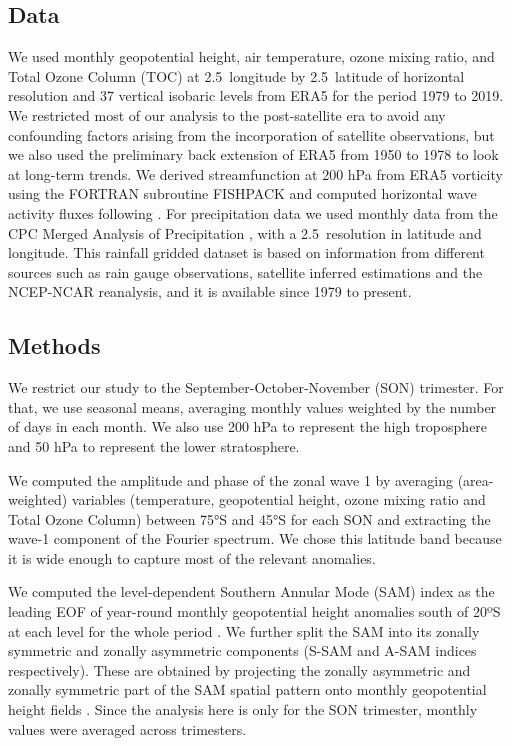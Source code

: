 \documentclass[smallextended]{svjour3}       %
\begin{document}
\hypertarget{data}{%
\subsection{Data}\label{data}}

We used monthly geopotential height, air temperature, ozone mixing ratio, and Total Ozone Column (TOC) at 2.5\degree~longitude by 2.5\degree~latitude of horizontal resolution and 37 vertical isobaric levels from ERA5 \citep{era5} for the period 1979 to 2019. We restricted most of our analysis to the post-satellite era to avoid any confounding factors arising from the incorporation of satellite observations, but we also used the preliminary back extension of ERA5 from 1950 to 1978 \citep{era5be} to look at long-term trends. We derived streamfunction at 200 hPa from ERA5 vorticity using the FORTRAN subroutine FISHPACK \citep{fishpack} and computed horizontal wave activity fluxes following \citet{plumb1985}. For precipitation data we used monthly data from the CPC Merged Analysis of Precipitation \citep{cmap}, with a 2.5\degree~resolution in latitude and longitude. This rainfall gridded dataset is based on information from different sources such as rain gauge observations, satellite inferred estimations and the NCEP-NCAR reanalysis, and it is available since 1979 to present.

\hypertarget{methods}{%
\subsection{Methods}\label{methods}}

We restrict our study to the September-October-November (SON) trimester. For that, we use seasonal means, averaging monthly values weighted by the number of days in each month. We also use 200 hPa to represent the high troposphere and 50 hPa to represent the lower stratosphere.

We computed the amplitude and phase of the zonal wave 1 by averaging (area-weighted) variables (temperature, geopotential height, ozone mixing ratio and Total Ozone Column) between 75°S and 45°S for each SON and extracting the wave-1 component of the Fourier spectrum. We chose this latitude band because it is wide enough to capture most of the relevant anomalies.

We computed the level-dependent Southern Annular Mode (SAM) index as the leading EOF of year-round monthly geopotential height anomalies south of 20ºS at each level for the whole period \citep{baldwin2009}. We further split the SAM into its zonally symmetric and zonally asymmetric components (S-SAM and A-SAM indices respectively). These are obtained by projecting the zonally asymmetric and zonally symmetric part of the SAM spatial pattern onto monthly geopotential height fields \citep{campitelli2021}. Since the analysis here is only for the SON trimester, monthly values were averaged across trimesters.
\end{document}
